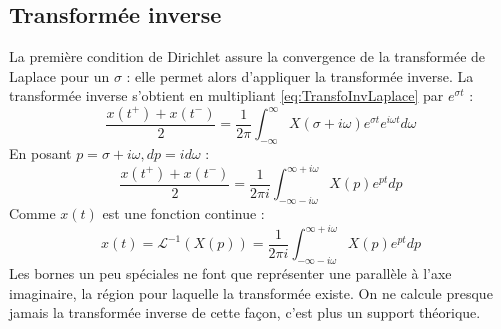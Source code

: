 	
	
	\subsection{Transformée inverse}
	La première condition de Dirichlet assure la convergence de la transformée de 
	Laplace pour un $\sigma$ : elle permet alors d'appliquer la transformée inverse.
	La transformée inverse s'obtient en multipliant \autoref{eq:TransfoInvLaplace} 
	par $e^{\sigma t}$ :
	\begin{equation}
	\frac{x(t^+)+x(t^-)}{2} = \frac{1}{2\pi}\int_{-\infty}^\infty X
	(\sigma + i\omega)e^{\sigma t} e^{i\omega t}d\omega
	\end{equation}
	En posant $p = \sigma + i\omega, dp = id\omega$ :
	\begin{equation}
	\frac{x(t^+)+x(t^-)}{2} = \frac{1}{2\pi i}\int_{-\infty-i\omega}^{\infty+i\omega} X
	(p)e^{pt}dp
	\end{equation}
	Comme $x(t)$ est une fonction continue :
	\begin{equation}
	x(t) = \mathcal{L}^{-1}(X(p)) = \frac{1}{2\pi i}\int_{-\infty-i\omega}^{\infty+i
	\omega} X(p)e^{pt}dp
	\end{equation}
	Les bornes un peu spéciales ne font que représenter une parallèle à l'axe 
	imaginaire, la région pour laquelle la transformée existe. On ne calcule presque
	jamais la transformée inverse de cette façon, c'est plus un support théorique.



